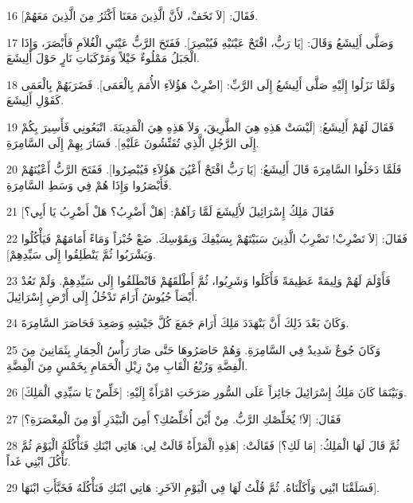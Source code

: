 \par 16 فَقَالَ: [لاَ تَخَفْ، لأَنَّ الَّذِينَ مَعَنَا أَكْثَرُ مِنَ الَّذِينَ مَعَهُمْ].
\par 17 وَصَلَّى أَلِيشَعُ وَقَالَ: [يَا رَبُّ، افْتَحْ عَيْنَيْهِ فَيُبْصِرَ]. فَفَتَحَ الرَّبُّ عَيْنَيِ الْغُلاَمِ فَأَبْصَرَ، وَإِذَا الْجَبَلُ مَمْلُوءٌ خَيْلاً وَمَرْكَبَاتِ نَارٍ حَوْلَ أَلِيشَعَ.
\par 18 وَلَمَّا نَزَلُوا إِلَيْهِ صَلَّى أَلِيشَعُ إِلَى الرَّبِّ: [اضْرِبْ هَؤُلاَءِ الأُمَمَ بِالْعَمَى]. فَضَرَبَهُمْ بِالْعَمَى كَقَوْلِ أَلِيشَعَ.
\par 19 فَقَالَ لَهُمْ أَلِيشَعُ: [لَيْسَتْ هَذِهِ هِيَ الطَّرِيقَ، وَلاَ هَذِهِ هِيَ الْمَدِينَةَ. اتْبَعُونِي فَأَسِيرَ بِكُمْ إِلَى الرَّجُلِ الَّذِي تُفَتِّشُونَ عَلَيْهِ]. فَسَارَ بِهِمْ إِلَى السَّامِرَةِ.
\par 20 فَلَمَّا دَخَلُوا السَّامِرَةَ قَالَ أَلِيشَعُ: [يَا رَبُّ افْتَحْ أَعْيُنَ هَؤُلاَءِ فَيُبْصِرُوا]. فَفَتَحَ الرَّبُّ أَعْيُنَهُمْ فَأَبْصَرُوا وَإِذَا هُمْ فِي وَسَطِ السَّامِرَةِ.
\par 21 فَقَالَ مَلِكُ إِسْرَائِيلَ لأَلِيشَعَ لَمَّا رَآهُمْ: [هَلْ أَضْرِبُ؟ هَلْ أَضْرِبُ يَا أَبِي؟]
\par 22 فَقَالَ: [لاَ تَضْرِبْ! تَضْرِبُ الَّذِينَ سَبَيْتَهُمْ بِسَيْفِكَ وَبِقَوْسِكَ. ضَعْ خُبْزاً وَمَاءً أَمَامَهُمْ فَيَأْكُلُوا وَيَشْرَبُوا ثُمَّ يَنْطَلِقُوا إِلَى سَيِّدِهِمْ].
\par 23 فَأَوْلَمَ لَهُمْ وَلِيمَةً عَظِيمَةً فَأَكَلُوا وَشَرِبُوا، ثُمَّ أَطْلَقَهُمْ فَانْطَلَقُوا إِلَى سَيِّدِهِمْ. وَلَمْ تَعُدْ أَيْضاً جُيُوشُ أَرَامَ تَدْخُلُ إِلَى أَرْضِ إِسْرَائِيلَ.
\par 24 وَكَانَ بَعْدَ ذَلِكَ أَنَّ بَنْهَدَدَ مَلِكَ أَرَامَ جَمَعَ كُلَّ جَيْشِهِ وَصَعِدَ فَحَاصَرَ السَّامِرَةَ.
\par 25 وَكَانَ جُوعٌ شَدِيدٌ فِي السَّامِرَةِ. وَهُمْ حَاصَرُوهَا حَتَّى صَارَ رَأْسُ الْحِمَارِ بِثَمَانِينَ مِنَ الْفِضَّةِ وَرُبْعُ الْقَابِ مِنْ زِبْلِ الْحَمَامِ بِخَمْسٍ مِنَ الْفِضَّةِ.
\par 26 وَبَيْنَمَا كَانَ مَلِكُ إِسْرَائِيلَ جَائِزاً عَلَى السُّورِ صَرَخَتِ امْرَأَةٌ إِلَيْهِ: [خَلِّصْ يَا سَيِّدِي الْمَلِكَ].
\par 27 فَقَالَ: [لاَ! يُخَلِّصْكِ الرَّبُّ. مِنْ أَيْنَ أُخَلِّصُكِ؟ أَمِنَ الْبَيْدَرِ أَوْ مِنَ الْمِعْصَرَةِ؟]
\par 28 ثُمَّ قَالَ لَهَا الْمَلِكُ: [مَا لَكِ؟] فَقَالَتْ: [هَذِهِ الْمَرْأَةُ قَالَتْ لِي: هَاتِي ابْنَكِ فَنَأْكُلَهُ الْيَوْمَ ثُمَّ نَأْكُلَ ابْنِي غَداً.
\par 29 فَسَلَقْنَا ابْنِي وَأَكَلْنَاهُ. ثُمَّ قُلْتُ لَهَا فِي الْيَوْمِ الآخَرِ: هَاتِي ابْنَكِ فَنَأْكُلَهُ فَخَبَّأَتِ ابْنَهَا].
